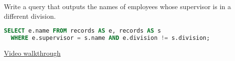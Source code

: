 \question Write a query that outputs the names of employees whose supervisor
is in a different division.
\begin{solution}[1.5in]
\begin{lstlisting}[language=SQL]
SELECT e.name FROM records AS e, records AS s
  WHERE e.supervisor = s.name AND e.division != s.division;
\end{lstlisting}
\href{https://youtu.be/BIV5O1U9Zdw?t=6m56s}{Video walkthrough}
\end{solution}
